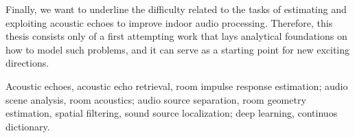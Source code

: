 {    \mynewline
    Finally, we want to underline the difficulty related to the tasks of estimating and exploiting acoustic echoes to improve indoor audio processing.
    Therefore, this thesis consists only of a first attempting work that lays analytical foundations on how to model such problems, and it can serve as a starting point for new exciting directions.

    Acoustic echoes, acoustic echo retrieval, room impulse response estimation;
    audio scene analysis, room acoustics;
    audio source separation, room geometry estimation, spatial filtering, sound source localization;
    deep learning, continuos dictionary.
}